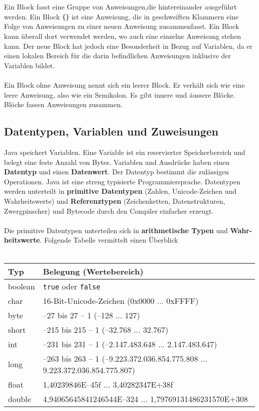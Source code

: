 \\\\
Ein Block fasst eine Gruppe von Anweisungen,die hintereinander ausgeführt werden. Ein Block \texttt{\{\}} ist eine Anweisung, die in geschweiften Klammern eine Folge von Anweisungen zu einer neuen Anweisung zusammenfasst. Ein Block kann überall dort verwendet werden, wo auch eine einzelne Anweisung stehen kann. Der neue Block hat jedoch eine Besonderheit in Bezug auf Variablen, da er einen lokalen Bereich für die darin befindlichen Anweisungen inklusive der Variablen bildet.
\\\\
Ein Block ohne Anweisung nennt sich ein leerer Block. Er verhält sich wie eine leere Anweisung, also wie ein Semikolon. Es gibt innere und äussere Blöcke. Blöcke fassen Anweisungen zusammen.
\subsection{Datentypen, Variablen und Zuweisungen}
Java speichert Variablen. Eine Variable ist ein reservierter Speicherbereich und belegt eine feste Anzahl von Bytes. Variablen und Ausdrücke haben einen \textbf{Datentyp} und einen \textbf{Datenwert}. Der Datentyp bestimmt die zulässigen Operationen. Java ist eine streng typisierte Programmiersprache. Datentypen werden unterteilt in \textbf{primitive Datentypen} (Zahlen, Unicode-Zeichen und Wahrheitswerte) und \textbf{Referenztypen} (Zeichenketten, Datenstrukturen, Zwergpinscher) und Bytecode durch den Compiler einfacher erzeugt.
\\\\
Die primitive Datentypen unterteilen sich in \textbf{arithmetische Typen} und \textbf{Wahr-heitswerte}. Folgende Tabelle vermittelt einen Überblick
\\\\
\begin{tabular}{|l|l|}
\hline
Typ&Belegung (Wertebereich)\\\hline
boolean&\texttt{true} oder \texttt{false}\\
char& 16-Bit-Unicode-Zeichen (0x0000 ... 0xFFFF)\\
byte&–27 bis 27 – 1 (–128 ... 127)\\
short&–215 bis 215 – 1 (–32.768 ... 32.767)\\
int&–231 bis 231 – 1 (–2.147.483.648 ... 2.147.483.647)\\
long&–263 bis 263 – 1 (–9.223.372.036.854.775.808 ... 9.223.372.036.854.775.807)\\
float&1,40239846E–45f ... 3,40282347E+38f\\
double&4,94065645841246544E–324 ... 1,79769131486231570E+308\\\hline
\end{tabular}

